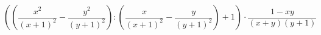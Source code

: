 \begin{ex}[type=expression]
	\begin{condition}
		\( \left( \left( \dfrac{x^2}{(x+1)^2}-\dfrac{y^2}{(y+1)^2} \right) :\left(\dfrac{x}{(x+1)^2}-\dfrac{y}{(y+1)^2}  \right)+1\right)\cdot\dfrac{1-xy}{(x+y)(y+1)} \)
	\end{condition}
\end{ex}